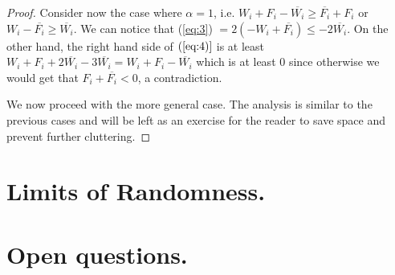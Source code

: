 \documentclass[11pt,letter]{article}
\begin{document}
\begin{proof}
Consider now the case where $\alpha = 1$, i.e. $W_i + F_i -\overline{W_i} \geq \overline{F_i} + F_i$ or $W_i - \overline{F_i} \geq \overline{W_i}$. 
We can notice that (\ref{eq:3}) $= 2(-W_i + \overline{F_i}) \leq -2\overline{W_i}$. On the other hand, the right hand side of  $(\ref{eq:4)}$ 
is at least $W_i + F_i + 2\overline{W_i} -3\overline{W_i} = W_i + F_i - \overline{W_i}$ which is at least $0$ since otherwise we would get 
that $F_i + \overline{F_i} < 0$, a contradiction. 

We now proceed with the more general case. The analysis is similar to the previous cases and will be left as an exercise 
for the reader to save space and prevent further cluttering. 

\end{proof}

\section{Limits of Randomness.}
\section{Open questions.}
 
 

\end{document}
